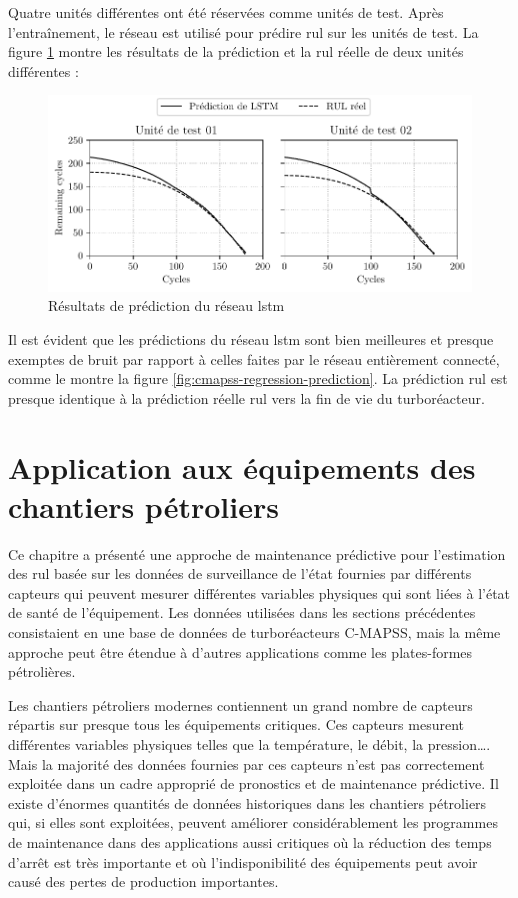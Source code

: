 Quatre unités différentes ont été réservées comme unités de test. Après l'entraînement, le réseau est utilisé pour prédire \acrshort{rul} sur les unités de test. La figure \ref{fig:cmapss-lstm-prediction} montre les résultats de la prédiction et la \acrshort{rul} réelle de deux unités différentes :

\begin{figure}[h]
    \centering
    \includegraphics{figures/cmapss_lstm_regression_predictions_fr.pdf}
    \caption{Résultats de prédiction du réseau \acrshort{lstm}}
    \label{fig:cmapss-lstm-prediction}
\end{figure}

Il est évident que les prédictions du réseau \acrshort{lstm} sont bien meilleures et presque exemptes de bruit par rapport à celles faites par le réseau entièrement connecté, comme le montre la figure \ref{fig:cmapss-regression-prediction}. La prédiction \acrshort{rul} est presque identique à la prédiction réelle \acrshort{rul} vers la fin de vie du turboréacteur.

\section{Application aux équipements des chantiers pétroliers}%
\label{sec:application_to_oilfield_equipment_1}
Ce chapitre a présenté une approche de maintenance prédictive pour l'estimation des \acrshort{rul} basée sur les données de surveillance de l'état fournies par différents capteurs qui peuvent mesurer différentes variables physiques qui sont liées à l'état de santé de l'équipement. Les données utilisées dans les sections précédentes consistaient en une base de données de turboréacteurs C-MAPSS, mais la même approche peut être étendue à d'autres applications comme les plates-formes pétrolières.

Les chantiers pétroliers modernes contiennent un grand nombre de capteurs répartis sur presque tous les équipements critiques. Ces capteurs mesurent différentes variables physiques telles que la température, le débit, la pression…. Mais la majorité des données fournies par ces capteurs n'est pas correctement exploitée dans un cadre approprié de pronostics et de maintenance prédictive. Il existe d'énormes quantités de données historiques dans les chantiers pétroliers qui, si elles sont exploitées, peuvent améliorer considérablement les programmes de maintenance dans des applications aussi critiques où la réduction des temps d'arrêt est très importante et où l'indisponibilité des équipements peut avoir causé des pertes de production importantes.

